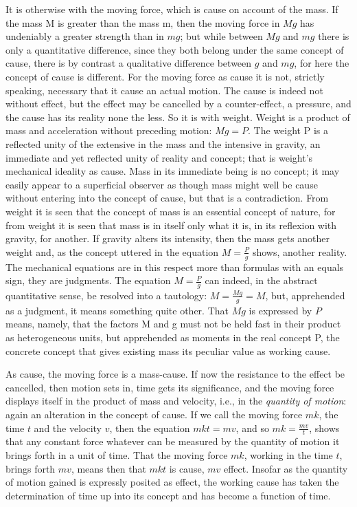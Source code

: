 \documentclass[12pt,a4paper]{book}
\begin{document}
It is otherwise with the moving force, which is cause on account of the mass. If the mass M
is greater than the mass m, then the moving force in $Mg$ has undeniably a greater strength
than in $mg$; but while between $Mg$ and $mg$ there is only a quantitative difference,
since they both belong under the same concept of cause, there is by contrast a qualitative
difference between $g$ and $mg$, for here the concept of cause is different. For the moving
force as cause it is not, strictly speaking, necessary that it cause an actual motion. The
cause is indeed not without effect, but the effect may be cancelled by a counter-effect, a
pressure, and the cause has its reality none the less. So it is with weight. Weight is a
product of mass and acceleration without preceding motion: $Mg = P$. The weight P is a
reflected unity of the extensive in the mass and the intensive in gravity, an immediate and
yet reflected unity of reality and concept; that is weight's mechanical ideality as cause.
Mass in its immediate being is no concept; it may easily appear to a superficial observer
as though mass might well be cause without entering into the concept of cause, but that is
a contradiction. From weight it is seen that the concept of mass is an essential concept of
nature, for from weight it is seen that mass is in itself only what it is, in its reflexion
with gravity, for another. If gravity alters its intensity, then the mass gets another
weight and, as the concept uttered in the equation $M = \frac{P}{g}$
shows, another reality. The mechanical equations are in this respect more than formulas
with an equals sign, they are judgments. The equation $M = \frac{P}{g}$ can indeed, in the
abstract quantitative sense, be resolved into a tautology: $M = \frac{Mg}{g} = M$, but,
apprehended as a judgment, it means something quite other. That $Mg$ is expressed by $P$
means, namely, that the factors M and g must not be held fast in their product as
heterogeneous units, but apprehended as moments in the real concept P, the concrete concept
that gives existing mass its peculiar value as working cause.

As cause, the moving force is a mass-cause. If now the resistance to the effect be
cancelled, then motion sets in, time gets its significance, and the moving force displays
itself in the product of mass and velocity, i.e., in the \emph{quantity of motion}: again
an alteration in the concept of cause. If we call the moving force $mk$, the time $t$ and
the velocity $v$, then the equation $mkt = mv$, and so $mk = \frac{mv}{t}$, shows that any
constant force whatever can be measured by the quantity of motion it brings forth in a unit
of time. That the moving force $mk$, working in the time $t$, brings forth $mv$, means then
that $mkt$ is cause, $mv$ effect. Insofar as the quantity of motion gained is expressly
posited as effect, the working cause has taken the determination of time up into its
concept and has become a function of time.
\end{document}

